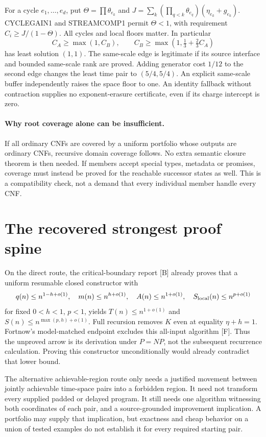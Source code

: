 \documentclass[11pt]{article}
\begin{document}
For a cycle $e_1,\ldots,e_d$, put $\Theta=\prod\theta_{e_k}$ and
$J=\sum_k(\prod_{q<k}\theta_{e_q})(\eta_{e_k}+g_{e_k})$.
CYCLEGAIN1 and STREAMCOMP1 permit $\Theta<1$, with requirement
$C_i\ge J/(1-\Theta)$. All cycles and local floors matter. In particular
\[
 C_A\ge\max(1,C_B),\qquad
 C_B\ge\max(1,\tfrac13+\tfrac23 C_A)
\]
has least solution $(1,1)$. The same-scale edge is legitimate if its source
interface and bounded same-scale rank are proved. Adding generator cost
$1/12$ to the second edge changes the least time pair to $(5/4,5/4)$.
An explicit same-scale buffer independently raises the space floor to one.
An identity fallback without contraction supplies no exponent-erasure
certificate, even if its charge intercept is zero.

\paragraph{Why root coverage alone can be insufficient.}
If all ordinary CNFs are covered by a uniform portfolio whose outputs are
ordinary CNFs, recursive domain coverage follows. No extra semantic closure
theorem is then needed. If members accept special types, metadata or
promises, coverage must instead be proved for the reachable successor
states as well. This is a compatibility check, not a demand that every
individual member handle every CNF.

\section{The recovered strongest proof spine}
On the direct route, the critical-boundary report [B] already proves that a
uniform resumable closed constructor with
\[
 q(n)\le n^{1-h+o(1)},\quad m(n)\le n^{h+o(1)},\quad
 A(n)\le n^{1+o(1)},\quad S_{\rm local}(n)\le n^{p+o(1)}
\]
for fixed $0<h<1$, $p<1$, yields
$T(n)\le n^{1+o(1)}$ and $S(n)\le n^{\max(p,h)+o(1)}$.
Full recursion removes $K$ even at equality $\eta+h=1$. Fortnow's
model-matched endpoint excludes this all-input algorithm [F]. Thus the
unproved arrow is its derivation under $P=NP$, not the subsequent recurrence
calculation. Proving this constructor unconditionally would already
contradict that lower bound.

The alternative achievable-region route only needs a justified movement
between jointly achievable time-space pairs into a forbidden region.
It need not transform every supplied padded or delayed program. It still
needs one algorithm witnessing both coordinates of each pair, and a
source-grounded improvement implication. A portfolio may supply that
implication, but exactness and cheap behavior on a union of tested examples
do not establish it for every required starting pair.
\end{document}
